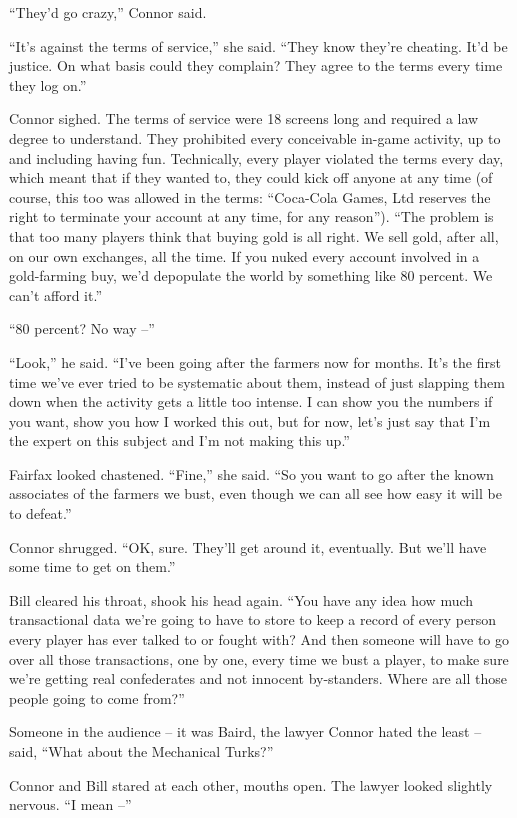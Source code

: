 ``They'd go crazy,'' Connor said.

``It's against the terms of service,'' she said. ``They know they're
cheating. It'd be justice. On what basis could they complain? They
agree to the terms every time they log on.''

Connor sighed. The terms of service were 18 screens long and
required a law degree to understand. They prohibited every
conceivable in-game activity, up to and including having fun.
Technically, every player violated the terms every day, which meant
that if they wanted to, they could kick off anyone at any time (of
course, this too was allowed in the terms: ``Coca-Cola Games, Ltd
reserves the right to terminate your account at any time, for any
reason''). ``The problem is that too many players think that buying
gold is all right. We sell gold, after all, on our own exchanges,
all the time. If you nuked every account involved in a gold-farming
buy, we'd depopulate the world by something like 80 percent. We
can't afford it.''

``80 percent? No way --''

``Look,'' he said. ``I've been going after the farmers now for months.
It's the first time we've ever tried to be systematic about them,
instead of just slapping them down when the activity gets a little
too intense. I can show you the numbers if you want, show you how I
worked this out, but for now, let's just say that I'm the expert on
this subject and I'm not making this up.''

Fairfax looked chastened. ``Fine,'' she said. ``So you want to go
after the known associates of the farmers we bust, even though we
can all see how easy it will be to defeat.''

Connor shrugged. ``OK, sure. They'll get around it, eventually. But
we'll have some time to get on them.''

Bill cleared his throat, shook his head again. ``You have any idea
how much transactional data we're going to have to store to keep a
record of every person every player has ever talked to or fought
with? And then someone will have to go over all those transactions,
one by one, every time we bust a player, to make sure we're getting
real confederates and not innocent by-standers. Where are all those
people going to come from?''

Someone in the audience -- it was Baird, the lawyer Connor hated
the least -- said, ``What about the Mechanical Turks?''

Connor and Bill stared at each other, mouths open. The lawyer
looked slightly nervous. ``I mean --''

